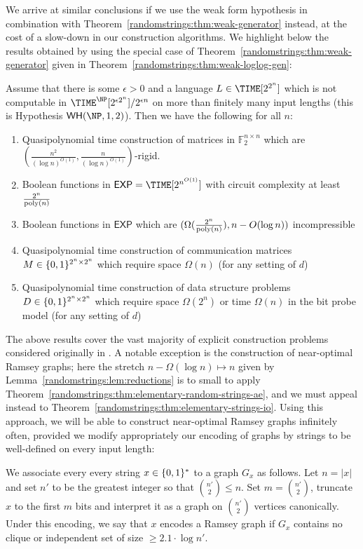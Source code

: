 We arrive at similar conclusions if we use the weak form hypothesis in combination with Theorem~\ref{randomstrings:thm:weak-generator} instead, at the cost of a slow-down in our construction algorithms. We highlight below the results obtained by using the special case of Theorem~\ref{randomstrings:thm:weak-generator} given in Theorem~\ref{randomstrings:thm:weak-loglog-gen}:
\begin{theorem}\label{randomstrings:thm:conditional-ecs-weak}
Assume that there is some $\epsilon > 0$ and a language $L \in \TIME[2^{2^n}]$ which is not computable in $\TIME^\NP[2^{\epsilon 2^n}]/2^{\epsilon n}$ on more than finitely many input lengths (this is Hypothesis $\WH(\NP,1,2)$). Then we have the following for all $n$:
\begin{enumerate}
    \item \sloppy Quasipolynomial time construction of matrices in $\mathbb{F}_2^{n \times n}$ which are $(\frac{n^2}{(\log n)^{O(1)}}, \frac{n}{(\log n)^{O(1)}})$-rigid. 
    \item Boolean functions in $\mathsf{EXP} = \TIME[2^{n^{O(1)}}]$ with circuit complexity at least $ \frac{2^n}{\mathrm{poly}(n)}$
    \item \sloppy Boolean functions in $\mathsf{EXP}$ which are ${(\Omega(\frac{2^n}{\mathrm{poly}(n)}), n- O(\log n))}$ incompressible
    \item Quasipolynomial time construction of communication matrices $M \in \{0,1\}^{2^n \times 2^n}$ which require space $\Omega(n)$ (for any setting of $d$)
    \item Quasipolynomial time construction of data structure problems $D \in \{0,1\}^{2^n \times 2^n}$ which require space $\Omega(2^n)$ or time $\Omega(n)$ in the bit probe model (for any setting of $d$)
\end{enumerate}

\end{theorem}


The above results cover the vast majority of explicit construction problems considered originally in \cite{Korten21}. A notable exception is the construction of near-optimal Ramsey graphs; here the stretch $n - \Omega(\log n) \mapsto n$ given by Lemma~\ref{randomstrings:lem:reductions} is to small to apply Theorem~\ref{randomstrings:thm:elementary-random-strings-ae}, and we must appeal instead to Theorem~\ref{randomstrings:thm:elementary-strings-io}. Using this approach, we will be able to construct near-optimal Ramsey graphs infinitely often, provided we modify appropriately our encoding of graphs by strings to be well-defined on every input length:
\begin{definition}
We associate every every string $x \in \{0,1\}^*$ to a graph $G_x$ as follows. Let $n = |x|$ and set $n'$ to be the greatest integer so that $\binom{n'}{2}\leq n$. Set $m = \binom{n'}{2}$, truncate $x$ to the first $m$ bits and interpret it as a graph on $\binom{n'}{2}$ vertices canonically. Under this encoding, we say that $x$ encodes a Ramsey graph if $G_x$ contains no clique or independent set of size $\geq2.1 \cdot \log n'$.
\end{definition}

